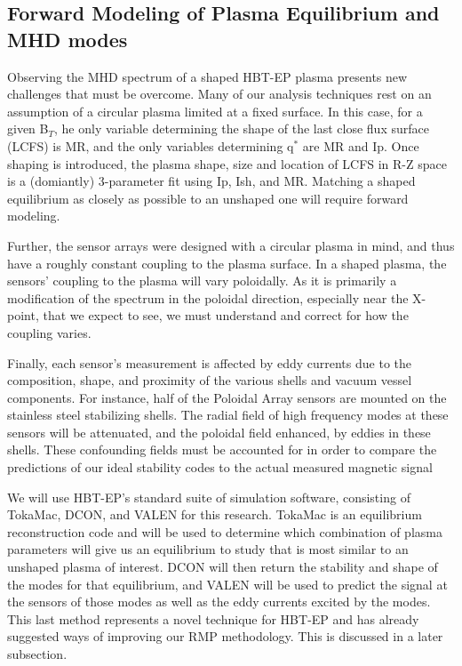 \documentclass[aps,prl,twocolumn,superscriptaddress,groupedaddress]{revtex4}  %
\begin{document}
\subsection{Forward Modeling of Plasma Equilibrium and MHD modes}
	Observing the MHD spectrum of a shaped HBT-EP plasma presents new challenges that must be overcome.  Many of our analysis techniques rest on an assumption of a circular plasma limited at a fixed surface.  In this case, for a given B$_T$, he only variable determining the shape of the last close flux surface (LCFS) is MR, and the only variables determining  q$^*$ are MR and Ip. Once shaping is introduced, the plasma shape, size and location of LCFS in R-Z space is a (domiantly) 3-parameter fit using Ip, Ish, and MR.  Matching a shaped equilibrium as closely as possible to an unshaped one will require forward modeling.\par
	Further, the sensor arrays were designed with a circular plasma in mind, and thus have a roughly constant coupling to the plasma surface.  In a shaped plasma, the sensors' coupling to the plasma will vary poloidally.  As it is primarily a modification of the spectrum in the poloidal direction, especially near the X-point, that we expect to see, we must understand and correct for how the coupling varies.\par
	Finally, each sensor's measurement is affected by eddy currents due to the composition, shape, and proximity of the various shells and vacuum vessel components.  For instance, half of the Poloidal Array sensors are mounted on the stainless steel stabilizing shells.  The radial field of high frequency modes at these sensors will be attenuated, and the poloidal field enhanced, by eddies in these shells.  These confounding fields must be accounted for in order to compare the predictions of our ideal stability codes to the actual measured magnetic signal\par
	We will use HBT-EP's standard suite of simulation software, consisting of TokaMac, DCON, and VALEN for this research.  TokaMac is an equilibrium reconstruction code and will be used to determine which combination of plasma parameters will give us an equilibrium to study that is most similar to an unshaped plasma of interest.  DCON will then return the stability and shape of the modes for that equilibrium, and VALEN will be used to predict the signal at the sensors of those modes as well as the eddy currents excited by the modes.  This last method represents a novel technique for HBT-EP and has already suggested ways of improving our RMP methodology.  This is discussed in a later subsection.
\end{document}
